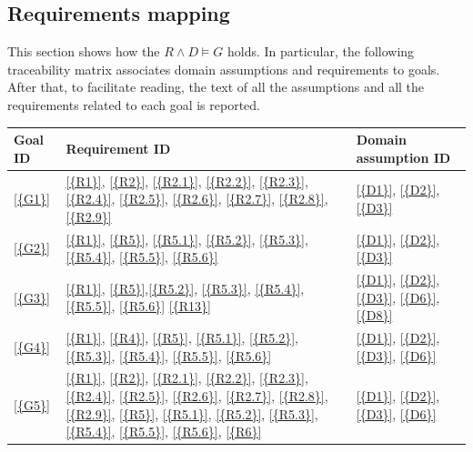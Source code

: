 \subsection{Requirements mapping}
This section shows how the $R\land D \models G$ holds.
In particular, the following traceability matrix associates domain assumptions and requirements to goals.
After that, to facilitate reading, the text of all the assumptions and all the requirements related to each goal is reported.
\begin{table}[H]
      \centering
      \begin{tabular}{|l|p{8cm}|p{5cm}|}
            \hline
            \textbf{Goal ID} & \textbf{Requirement ID} & \textbf{Domain assumption ID}      \\\hline
            \ref{{G1}}       & \ref{{R1}}, \ref{{R2}}, \ref{{R2.1}}, \ref{{R2.2}}, \ref{{R2.3}}, \ref{{R2.4}}, \ref{{R2.5}}, \ref{{R2.6}}, \ref{{R2.7}}, \ref{{R2.8}}, \ref{{R2.9}}   & \ref{{D1}}, \ref{{D2}}, \ref{{D3}}                
             \\\hline
             
            \ref{{G2}}       & \ref{{R1}}, \ref{{R5}}, \ref{{R5.1}}, \ref{{R5.2}}, \ref{{R5.3}}, \ref{{R5.4}}, \ref{{R5.5}}, \ref{{R5.6}}
            & \ref{{D1}}, \ref{{D2}}, \ref{{D3}}     \\\hline
            
            \ref{{G3}}
            &
            \ref{{R1}}, \ref{{R5}},\ref{{R5.2}}, \ref{{R5.3}}, \ref{{R5.4}}, \ref{{R5.5}}, \ref{{R5.6}} \ref{{R13}}  
            & 
            \ref{{D1}}, \ref{{D2}}, \ref{{D3}}, \ref{{D6}}, \ref{{D8}}  \\\hline
            
            \ref{{G4}}
            & 
            \ref{{R1}}, \ref{{R4}}, \ref{{R5}}, \ref{{R5.1}}, \ref{{R5.2}}, \ref{{R5.3}}, \ref{{R5.4}}, \ref{{R5.5}}, \ref{{R5.6}}
            & 
            \ref{{D1}}, \ref{{D2}}, \ref{{D3}}, \ref{{D6}}                                \\\hline

            
            \ref{{G5}}       
            &
            \ref{{R1}}, \ref{{R2}}, \ref{{R2.1}}, \ref{{R2.2}}, \ref{{R2.3}}, \ref{{R2.4}}, \ref{{R2.5}}, \ref{{R2.6}}, \ref{{R2.7}}, \ref{{R2.8}}, \ref{{R2.9}}, \ref{{R5}}, \ref{{R5.1}}, \ref{{R5.2}}, \ref{{R5.3}}, \ref{{R5.4}}, \ref{{R5.5}}, \ref{{R5.6}}, \ref{{R6}}
            & 
            \ref{{D1}}, \ref{{D2}}, \ref{{D3}}, \ref{{D6}}                     
            \\\hline
            

\end{tabular}
\end{table}
